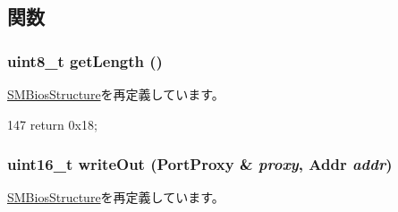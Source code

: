\subsection{関数}
\hypertarget{classX86ISA_1_1SMBios_1_1BiosInformation_a51bcc6f780d66596dbc3bedd845bc013}{
\subsubsection[{getLength}]{\setlength{\rightskip}{0pt plus 5cm}uint8\_\-t getLength ()}}
\label{classX86ISA_1_1SMBios_1_1BiosInformation_a51bcc6f780d66596dbc3bedd845bc013}


\hyperlink{classX86ISA_1_1SMBios_1_1SMBiosStructure_a63b44afdbd3bcc5b87e2e443ceaa4d61}{SMBiosStructure}を再定義しています。


\begin{DoxyCode}
147 { return 0x18; }
\end{DoxyCode}
\hypertarget{classX86ISA_1_1SMBios_1_1BiosInformation_a2dbf6f51e91cb24abfc247d73c0b857d}{
\subsubsection[{writeOut}]{\setlength{\rightskip}{0pt plus 5cm}uint16\_\-t writeOut ({\bf PortProxy} \& {\em proxy}, \/  {\bf Addr} {\em addr})}}
\label{classX86ISA_1_1SMBios_1_1BiosInformation_a2dbf6f51e91cb24abfc247d73c0b857d}


\hyperlink{classX86ISA_1_1SMBios_1_1SMBiosStructure_a2dbf6f51e91cb24abfc247d73c0b857d}{SMBiosStructure}を再定義しています。


